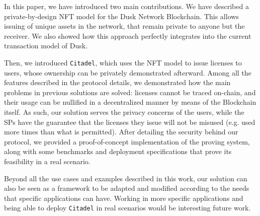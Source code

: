 In this paper, we have introduced two main contributions. We have described a private-by-design NFT model for the Dusk Network Blockchain. This allows issuing of unique assets in the network, that remain private to anyone but the receiver. We also showed how this approach perfectly integrates into the current transaction model of Dusk. 

Then, we introduced \verb!Citadel!, which uses the NFT model to issue licenses to users, whose ownership can be privately demonstrated afterward. Among all the features described in the protocol details, we demonstrated how the main problems in previous solutions are solved: licenses cannot be traced on-chain, and their usage can be nullified in a decentralized manner by means of the Blockchain itself. As such, our solution serves the privacy concerns of the users, while the SPs have the guarantee that the licenses they issue will not be misused (e.g. used more times than what is permitted). After detailing the security behind our protocol, we provided a proof-of-concept implementation of the proving system, along with some benchmarks and deployment specifications that prove its feasibility in a real scenario.

Beyond all the use cases and examples described in this work, our solution can also be seen as a framework to be adapted and modified according to the needs that specific applications can have. Working in more specific applications and being able to deploy \verb!Citadel! in real scenarios would be interesting future work.
